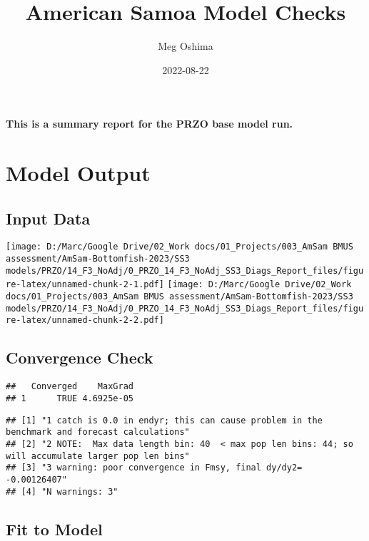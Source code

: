 \documentclass[
]{article}
\title{American Samoa Model Checks}
\author{Meg Oshima}
\date{2022-08-22}
\begin{document}
\maketitle

\textbf{This is a summary report for the PRZO base model run.}

\hypertarget{model-output}{%
\section{Model Output}\label{model-output}}

\hypertarget{input-data}{%
\subsection{Input Data}\label{input-data}}

\texttt{[image: D:/Marc/Google Drive/02\_Work docs/01\_Projects/003\_AmSam BMUS assessment/AmSam-Bottomfish-2023/SS3 models/PRZO/14\_F3\_NoAdj/0\_PRZO\_14\_F3\_NoAdj\_SS3\_Diags\_Report\_files/figure-latex/unnamed-chunk-2-1.pdf]}
\texttt{[image: D:/Marc/Google Drive/02\_Work docs/01\_Projects/003\_AmSam BMUS assessment/AmSam-Bottomfish-2023/SS3 models/PRZO/14\_F3\_NoAdj/0\_PRZO\_14\_F3\_NoAdj\_SS3\_Diags\_Report\_files/figure-latex/unnamed-chunk-2-2.pdf]}

\hypertarget{convergence-check}{%
\subsection{Convergence Check}\label{convergence-check}}

\begin{verbatim}
##   Converged    MaxGrad
## 1      TRUE 4.6925e-05
\end{verbatim}

\begin{verbatim}
## [1] "1 catch is 0.0 in endyr; this can cause problem in the benchmark and forecast calculations"      
## [2] "2 NOTE:  Max data length bin: 40  < max pop len bins: 44; so will accumulate larger pop len bins"
## [3] "3 warning: poor convergence in Fmsy, final dy/dy2= -0.00126407"                                  
## [4] "N warnings: 3"
\end{verbatim}

\hypertarget{fit-to-model}{%
\subsection{Fit to Model}\label{fit-to-model}}
\end{document}
